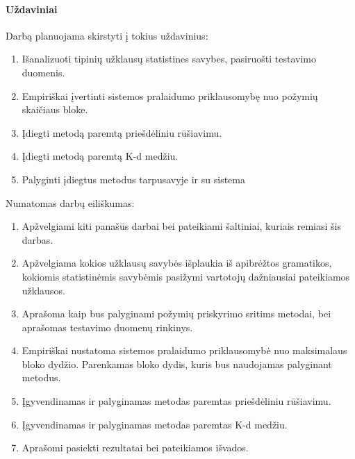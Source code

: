 \paragraph{Uždaviniai}
Darbą planuojama skirstyti į tokius uždavinius:

\begin{enumerate}
	\item Išanalizuoti tipinių užklausų statistines savybes, pasiruošti testavimo duomenis.
	\item Empiriškai įvertinti sistemos pralaidumo priklausomybę nuo požymių skaičiaus bloke.
	\item Įdiegti metodą paremtą priešdėliniu rūšiavimu.
	\item Įdiegti metodą paremtą K-d medžiu.
	\item Palyginti įdiegtus metodus tarpusavyje ir su sistema \cite{NeurotechnologyMegamatcherAccelerator}
\end{enumerate}

Numatomas darbų eiliškumas:
\begin{enumerate}
	\item Apžvelgiami kiti panašūs darbai bei pateikiami šaltiniai, kuriais remiasi šis darbas.
	\item Apžvelgiama kokios užklausų savybės išplaukia iš apibrėžtos gramatikos, kokiomis statistinėmis savybėmis pasižymi vartotojų dažniausiai pateikiamos užklausos.
	\item Aprašoma kaip bus palyginami požymių priskyrimo sritims metodai, bei aprašomas testavimo duomenų rinkinys.
	\item Empiriškai nustatoma sistemos pralaidumo priklausomybė nuo maksimalaus bloko dydžio. Parenkamas bloko dydis, kuris bus naudojamas palyginant metodus.
	\item Įgyvendinamas ir palyginamas metodas paremtas priešdėliniu rūšiavimu.
	\item Įgyvendinamas ir palyginamas metodas paremtas K-d medžiu.
	\item Aprašomi pasiekti rezultatai bei pateikiamos išvados.
\end{enumerate}


